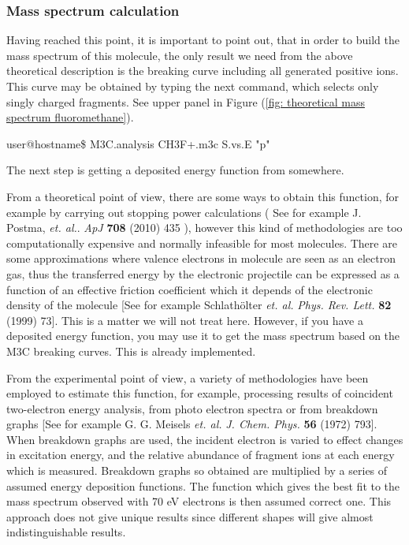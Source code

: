 \documentclass[a4paper,12pt]{article}
\begin{document}
\subsubsection{Mass spectrum calculation}

Having reached this point, it is important to point out, that in order to build the mass spectrum of this molecule, the only result we need from the above 
theoretical description is the breaking curve including all generated positive ions. This curve may be obtained by typing the next command,
which selects only singly charged fragments. See upper panel in Figure (\ref{fig: theoretical mass spectrum fluoromethane}).

\begin{shellexec}
user@hostname\$ M3C.analysis CH3F+.m3c S.vs.E "p"
\end{shellexec}

The next step is getting a deposited energy function from somewhere.

From a theoretical point of view, there are some ways to obtain this function, for example by carrying out stopping power calculations
( See for example J. Postma, \textit{et. al.}. \textit{ApJ} \textbf{708} (2010) 435 ), however this kind 
of methodologies are too computationally expensive and normally infeasible for most molecules. There are some approximations where valence electrons in 
molecule are seen as an electron gas, thus the transferred energy by the electronic projectile can be expressed as a function of an effective friction 
coefficient which it depends of the electronic density of the molecule [See for example Schlathölter \textit{et. al.} \textit{Phys. Rev. Lett.} \textbf{82} 
(1999) 73]. This is a matter we will not treat here. However, if you have a deposited energy function, you may use it to get the mass spectrum based on the M3C 
breaking curves. This is already implemented.

From the experimental point of view, a variety of methodologies have been employed to estimate this function, for example, processing results of 
coincident two-electron energy analysis, from photo electron spectra or from breakdown graphs [See for example G. G. Meisels \textit{et. al.} \textit{J. 
Chem. Phys.} \textbf{56} (1972) 793]. When breakdown graphs are used, the incident electron is varied to effect changes in excitation energy, and the relative 
abundance of fragment ions at each energy which is measured. Breakdown graphs so obtained are multiplied by a series of assumed energy deposition functions. The 
function which gives the best fit to the mass spectrum observed with 70 eV electrons is then assumed correct one. This approach does not give unique 
results since different shapes will give almost indistinguishable results.
\end{document}
